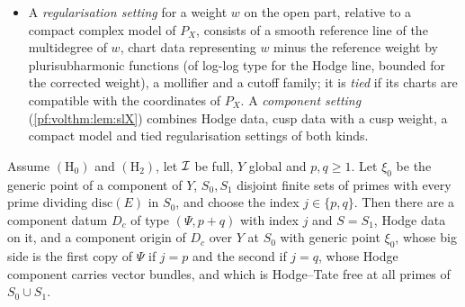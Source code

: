 \begin{itemize}
point its value is the cusp weight of the polarised lattice of the fibre, computed with the labels of the small side.
\item A \emph{regularisation setting} for a weight $w$ on the open part, relative to a compact complex model of
$P_X$, consists of a smooth reference line of the multidegree of $w$, chart data representing $w$ minus the reference
weight by plurisubharmonic functions (of log-log type for the Hodge line, bounded for the corrected weight), a
mollifier and a cutoff family; it is \emph{tied} if its charts are compatible with the coordinates of $P_X$. A
\emph{component setting} (\cref{pf:volthm:lem:slX}) combines Hodge data, cusp data with a cusp weight, a compact
model and tied regularisation settings of both kinds.
\end{itemize}

\begin{proposition}\label{pf:volthm:prop:generic}
Assume $(\mathrm{H}_0)$ and $(\mathrm{H}_2)$, let $\mathcal{I}$ be full, $Y$ global and $p,q\ge1$. Let $\xi_0$ be the generic
point of a component of $Y$, $S_0,S_1$ disjoint finite sets of primes with every prime dividing $\mathrm{disc}(E)$ in
$S_0$, and choose the index $j\in\{p,q\}$. Then there are a component datum $D_c$ of type $(\Psi,p+q)$ with index $j$
and $S=S_1$, Hodge data on it, and a component origin of $D_c$ over $Y$ at $S_0$ with generic point $\xi_0$, whose big
side is the first copy of $\Psi$ if $j=p$ and the second if $j=q$, whose Hodge component carries vector bundles, and
which is Hodge--Tate free at all primes of $S_0\cup S_1$.
\end{proposition}

